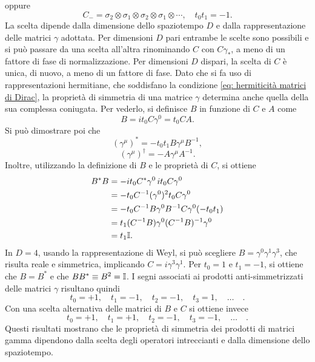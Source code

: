 oppure
\begin{equation}
\label{eq: definizione matrice C-}
    C_-=\sigma_2\otimes\sigma_1\otimes\sigma_2
    \otimes\sigma_1\otimes\cdots,
    \quad t_0t_1=-1.
\end{equation}
La scelta dipende dalla dimensione dello spaziotempo $D$ e dalla rappresentazione delle matrici $\gamma$ adottata. Per dimensioni $D$ pari entrambe le scelte sono possibili e si può passare da una scelta all'altra rinominando $C$ con $C\gamma_*$, a meno di un fattore di fase di normalizzazione. Per dimensioni $D$ dispari, la scelta di $C$ è unica, di nuovo, a meno di un fattore di fase. Dato che si fa uso di rappresentazioni hermitiane, che soddisfano la condizione \eqref{eq: hermiticità matrici di Dirac}, la proprietà di simmetria di una matrice $\gamma$ determina anche quella della sua complessa coniugata. Per vederlo, si definisce $B$ in funzione di $C$ e $A$ come
\begin{equation}
\label{eq: definizione matrice B}
    B = it_0C\gamma^0 = t_0CA.
\end{equation}
Si può dimostrare poi che 
\begin{equation}
\label{eq: complesso coniugato gamma^*}
    (\gamma^\mu)^* = -t_0t_1B\gamma^\mu B^{-1},
\end{equation}
\begin{equation}
    (\gamma^\mu)^\dag = -A\gamma^\mu A^{-1}.
\end{equation}
Inoltre, utilizzando la definizione di $B$ e le proprietà di $C$, si ottiene
\begin{equation}
    \begin{split}
    B^*B &=-it_0C^*\gamma^0\,it_0C\gamma^0 \\
    &= -t_0C^{-1}(\gamma^0)^2t_0C\gamma^0 \\
    &= -t_0C^{-1}B\gamma^0B^{-1}C\gamma^0(-t_0t_1) \\
    &= t_1(C^{-1}B)\gamma^0(C^{-1}B)^{-1}\gamma^0 \\
    &= t_1\mathbb{I}.
    \end{split}
\end{equation}
In $ D = 4$, usando la rappresentazione di Weyl, si può scegliere $B = \gamma^0\gamma^1\gamma^3$, che risulta reale e simmetrica, implicando $C = i\gamma^3\gamma^1$. Per $t_0 = 1$ e $t_1 = -1$, si ottiene che $B = B^*$ e che $BB^* \equiv B^2 = \mathbb{I}$. I segni associati ai prodotti anti-simmetrizzati delle matrici $\gamma$ risultano quindi
\begin{equation}
    t_0 = +1,\quad t_1 = -1,\quad t_2 = -1,\quad t_3 = 1,\quad \dots\quad.
\end{equation}
Con una scelta alternativa delle matrici di $B$ e $C$ si ottiene invece
\begin{equation}
    t_0 = +1,\quad t_1 = +1,\quad t_2 = -1,\quad t_3 = -1,\quad \dots\quad.
\end{equation}
Questi risultati mostrano che le proprietà di simmetria dei prodotti di matrici gamma dipendono dalla scelta degli operatori intreccianti e dalla dimensione dello spaziotempo.

